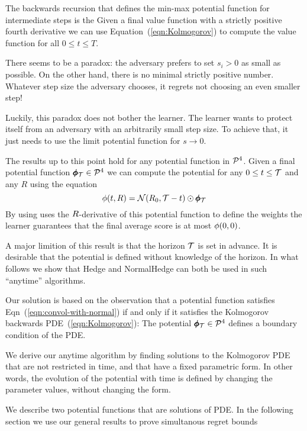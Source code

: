 \documentclass{article}[12pt]
\begin{document}
The backwards recursion that defines the min-max potential function
for intermediate steps is the 
Given a final value function with a strictly positive fourth
derivative we can use Equation~(\ref{eqn:Kolmogorov}) to compute the
value function for all $0 \leq t \leq T$. 

There seems to be a paradox: the adversary prefers to set $s_i>0$ as
small as possible. On the other hand, there is no minimal strictly
positive number. Whatever step size the adversary chooses, it regrets
not choosing an even smaller step!

Luckily, this paradox does not bother the learner. The learner wants
to protect itself from an adversary with an arbitrarily small step
size. To achieve that, it just needs to use the limit potential function for $s \to 0$.

The results up to this point hold for any potential function in
${\cal P}^{4}$. Given a final potential function $\pmb{\phi}_{\mathcal{T}} \in {\cal P}^{4}$ we
can compute the potential for any $0 \leq t \leq \mathcal{T}$ and any $R$ using the equation 
\begin{equation} \label{eqn:convol-with-normal}
\phi(t,R)={\cal N}(R_0,\mathcal{T}-t) \odot \pmb{\phi}_{\mathcal{T}}
\end{equation}
By using uses the $R$-derivative of this potential function to define
the weights the learner guarantees that the final average score is at
most $\phi(0,0)$.

A major limition of this result is that the horizon $\mathcal{T}$ is set in
advance.  It is desirable that the potential is defined without
knowledge of the horizon.  In what follows we show that Hedge and
NormalHedge can both be used in such ``anytime'' algorithms.

Our solution is based on the observation that a potential function satisfies Eqn~(\ref{eqn:convol-with-normal}) if and only if it satisfies 
the Kolmogorov backwards PDE~(\ref{eqn:Kolmogorov}):
The potential $\pmb{\phi}_{\mathcal{T}} \in {\cal P}^{4}$ defines a boundary condition of the PDE.

We derive our anytime algorithm by finding solutions to the Kolmogorov
PDE that are not restricted in time, and that have a fixed parametric
form.  In other words, the evolution of the potential with time is
defined by changing the parameter values, without changing the form.

We describe two potential functions that are solutions of PDE. In the following section we use our general results to prove simultanous regret bounds
\end{document}
